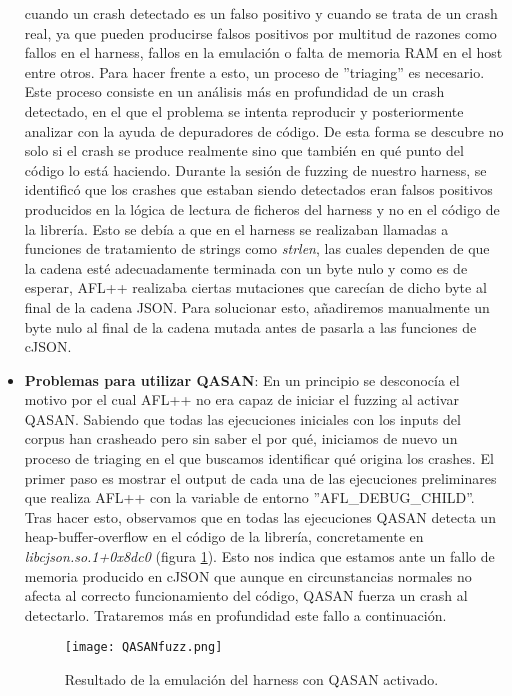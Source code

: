 \begin{itemize}
    cuando un crash detectado es un falso positivo y cuando se trata de un crash real, ya que pueden producirse falsos positivos por
    multitud de razones como fallos en el harness, fallos en la emulación o falta de memoria RAM en el host entre otros. Para hacer frente a esto, 
    un proceso de ''triaging'' es necesario. Este proceso consiste en un análisis más en profundidad de un crash detectado, en el que 
    el problema se intenta reproducir y posteriormente analizar con la ayuda de depuradores de código. De esta forma se descubre no solo 
    si el crash se produce realmente sino que también en qué punto del código lo está haciendo. Durante la sesión de fuzzing de nuestro 
    harness, se identificó que los crashes que estaban siendo detectados eran falsos positivos producidos en la lógica de lectura de 
    ficheros del harness y no en el código de la librería. Esto se debía a que en el harness se realizaban llamadas a funciones de 
    tratamiento de strings como \textit{strlen}, las cuales dependen de que la cadena esté adecuadamente terminada con un byte nulo y 
    como es de esperar, AFL++ realizaba ciertas mutaciones que carecían de dicho byte al final de la cadena JSON. Para solucionar esto,
    añadiremos manualmente un byte nulo al final de la cadena mutada antes de pasarla a las funciones de cJSON. 
    \item \textbf{Problemas para utilizar QASAN}: En un principio se desconocía el motivo por el cual AFL++ no era capaz de iniciar el 
    fuzzing al activar QASAN. Sabiendo que todas las ejecuciones iniciales con los inputs del corpus han crasheado pero sin saber el 
    por qué, iniciamos de nuevo un proceso de triaging en el que buscamos identificar qué origina los crashes. El primer paso es mostrar 
    el output de cada una de las ejecuciones preliminares que realiza AFL++ con la variable de entorno ''AFL\_DEBUG\_CHILD''. Tras hacer esto,
    observamos que en todas las ejecuciones QASAN detecta un heap-buffer-overflow en el código de la librería, concretamente en \textit{libcjson.so.1+0x8dc0}
    (figura \ref{fig:QASANfuzz}). Esto nos indica que estamos ante un fallo de memoria producido en cJSON que aunque en circunstancias normales
    no afecta al correcto funcionamiento del código, QASAN fuerza un crash al detectarlo. Trataremos más en profundidad este fallo a continuación.
    \begin{figure}[H]
        \centering
        \texttt{[image: QASANfuzz.png]}
        \caption{Resultado de la emulación del harness con QASAN activado.}
        \label{fig:QASANfuzz}
    \end{figure}
\end{itemize}

